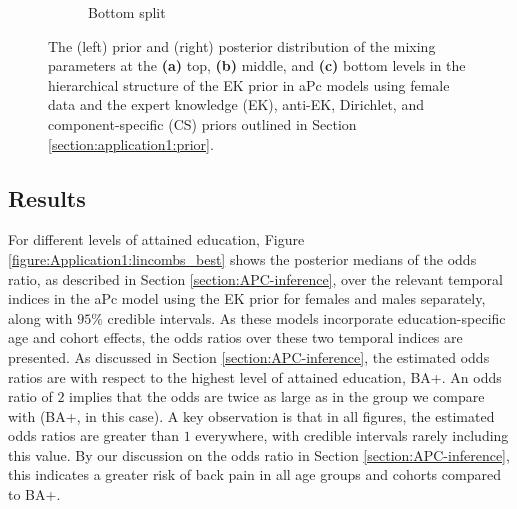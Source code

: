 \begin{figure}[!ht]
\begin{subfigure}[b]{0.8\textwidth}
        \caption[]%
        {{\small  Bottom split}}    
        \label{figure:Application1:s3_f}
    \end{subfigure}
    \vspace{-0.2cm}
    \caption{The (left) prior and (right) posterior distribution of the mixing parameters at the \textbf{(a)} top, \textbf{(b)} middle, and \textbf{(c)} bottom levels in the hierarchical structure of the EK prior in aPc models using female data and the expert knowledge (EK), anti-EK, Dirichlet, and component-specific (CS) priors outlined in Section \ref{section:application1:prior}. }
    \label{fig:application1:compare-plots_f}
\end{figure}

\FloatBarrier
\subsection{Results}\label{section:application1:results}
\vspace{-0.2cm}
For different levels of attained education, Figure \ref{figure:Application1:lincombs_best} shows the posterior medians of the odds ratio, as described in Section \ref{section:APC-inference}, over the relevant temporal indices in the aPc model using the EK prior for females and males separately, along with $95\%$ credible intervals. As these models incorporate education-specific age and cohort effects, the odds ratios over these two temporal indices are presented. As discussed in Section \ref{section:APC-inference}, the estimated odds ratios are with respect to the highest level of attained education, BA+. An odds ratio of $2$ implies that the odds are twice as large as in the group we compare with (BA+, in this case). A key observation is that in all figures, the estimated odds ratios are greater than $1$ everywhere, with credible intervals rarely including this value. By our discussion on the odds ratio in Section \ref{section:APC-inference}, this indicates a greater risk of back pain in all age groups and cohorts compared to BA+.


